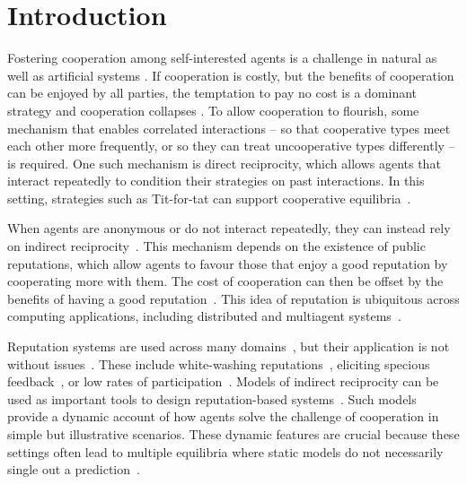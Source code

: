 \documentclass[sigconf]{aamas}  %
\begin{document}

\section{Introduction}
 
 Fostering cooperation among self-interested agents is a challenge in natural as well as artificial systems \cite{axelrod:book:1984}. If cooperation is costly, but the benefits of cooperation can be enjoyed by all parties, the temptation to pay no cost is a dominant strategy and cooperation collapses \cite{rapoport:book:1965}. To allow cooperation to flourish, some mechanism that enables correlated interactions -- so that cooperative types meet each other more frequently, or so they can treat uncooperative types differently -- is required. One such mechanism is direct reciprocity, which allows agents that interact repeatedly to condition their strategies on past interactions. In this setting, strategies such as Tit-for-tat can support cooperative equilibria~\cite{imhof:PRSB:2010,van-veelen:PNAS:2012,foerster2018learning, garcia2018no}. 
 
 When agents are anonymous or do not interact repeatedly, they can instead rely on indirect reciprocity~\cite{nowak:Nature:2005}. This mechanism depends on the existence of public reputations, which allow agents to favour those that enjoy a good reputation by cooperating more with them. The cost of cooperation can then be offset by the benefits of having a good reputation~\cite{mailath2006repeated}. This idea of reputation is ubiquitous across computing applications, including distributed and multiagent systems~\cite{vogiatzis2010probabilistic, granatyr2015trust}. 
 
 Reputation systems are used across many domains~\cite{Hendrikx2015}, but their application is not without issues~\cite{hoffman2009survey}. These include white-washing reputations~\cite{friedman2001social}, eliciting specious feedback~\cite{jurca2003incentive}, or low rates of participation~\cite{resnick2000reputation}. Models of indirect reciprocity can be used as important tools to design reputation-based systems~\cite{santos:aamas:2017, santos_social_2018, santos2018indirect}. Such models provide a dynamic account of how agents solve the challenge of cooperation in simple but illustrative scenarios. These dynamic features are crucial because these settings often lead to multiple equilibria where static models do not necessarily single out a prediction~\cite{mailath2006repeated}.
\end{document}
